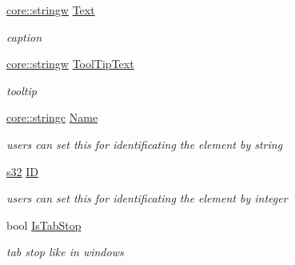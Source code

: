 \begin{DoxyCompactItemize}
\mbox{\label{classirr_1_1gui_1_1IGUIElement_af37f64cdacde0959e4993d01f555eba8}} 
\hyperlink{namespaceirr_1_1core_aef83fafbb1b36fcce44c07c9be23a7f2}{core\+::stringw} \hyperlink{classirr_1_1gui_1_1IGUIElement_af37f64cdacde0959e4993d01f555eba8}{Text}
\begin{DoxyCompactList}\small\item\em caption \end{DoxyCompactList}\item 
\mbox{\label{classirr_1_1gui_1_1IGUIElement_a422166b880f7829ec4e7b31322df9061}} 
\hyperlink{namespaceirr_1_1core_aef83fafbb1b36fcce44c07c9be23a7f2}{core\+::stringw} \hyperlink{classirr_1_1gui_1_1IGUIElement_a422166b880f7829ec4e7b31322df9061}{Tool\+Tip\+Text}
\begin{DoxyCompactList}\small\item\em tooltip \end{DoxyCompactList}\item 
\mbox{\label{classirr_1_1gui_1_1IGUIElement_acdc67728b14f264b38d194853c5b5179}} 
\hyperlink{namespaceirr_1_1core_ade1071a878633f2f6d8a75c5d11fec19}{core\+::stringc} \hyperlink{classirr_1_1gui_1_1IGUIElement_acdc67728b14f264b38d194853c5b5179}{Name}
\begin{DoxyCompactList}\small\item\em users can set this for identificating the element by string \end{DoxyCompactList}\item 
\mbox{\label{classirr_1_1gui_1_1IGUIElement_a73a25c6d25bd673d92210fc2d60d916e}} 
\hyperlink{namespaceirr_ac66849b7a6ed16e30ebede579f9b47c6}{s32} \hyperlink{classirr_1_1gui_1_1IGUIElement_a73a25c6d25bd673d92210fc2d60d916e}{ID}
\begin{DoxyCompactList}\small\item\em users can set this for identificating the element by integer \end{DoxyCompactList}\item 
\mbox{\label{classirr_1_1gui_1_1IGUIElement_af98dfbfc8776221b3a70ceea43fc4f9a}} 
bool \hyperlink{classirr_1_1gui_1_1IGUIElement_af98dfbfc8776221b3a70ceea43fc4f9a}{Is\+Tab\+Stop}
\begin{DoxyCompactList}\small\item\em tab stop like in windows \end{DoxyCompactList}\item 

\end{DoxyCompactItemize}
